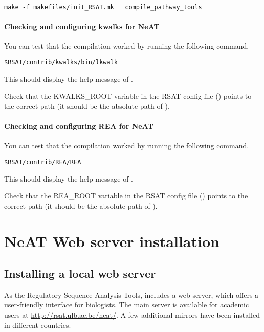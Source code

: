 \documentclass{book}
\begin{document}
\begin{lstlisting}
make -f makefiles/init_RSAT.mk   compile_pathway_tools
\end{lstlisting}

\subsubsection{Checking and configuring kwalks for NeAT}

You can test that the compilation worked by running the following
command.

\begin{lstlisting}
$RSAT/contrib/kwalks/bin/lkwalk
\end{lstlisting}

This should display the help message of .

Check that the KWALKS\_ROOT variable in the RSAT config file
() points to the correct path (it
should be the absolute path of ).

\subsubsection{Checking and configuring REA for NeAT}

You can test that the compilation worked by running the following
command.

\begin{lstlisting}
$RSAT/contrib/REA/REA
\end{lstlisting}

This should display the help message of .

Check that the REA\_ROOT variable in the RSAT config file
() points to the correct path (it
should be the absolute path of ).

\chapter{NeAT Web server installation}
\section{Installing a local web server}

As the Regulatory Sequence Analysis Tools, \neat includes a web
server, which offers a user-friendly interface for biologists. The
main server is available for academic users at
\url{http://rsat.ulb.ac.be/neat/}. A few additional mirrors have been
installed in different countries.
\end{document}
